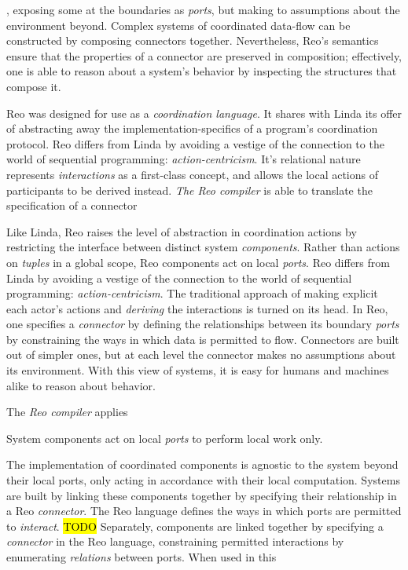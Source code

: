 , exposing some at the boundaries as \textit{ports}, but making to assumptions about the environment beyond. Complex systems of coordinated data-flow can be constructed by composing connectors together. Nevertheless, Reo's semantics ensure that the properties of a connector are preserved in composition; effectively, one is able to reason about a system's behavior by inspecting the structures that compose it.

Reo was designed for use as a \textit{coordination language}. It shares with Linda its offer of abstracting away the implementation-specifics of a program's coordination protocol. Reo differs from Linda by avoiding a vestige of the connection to the world of sequential programming: \textit{action-centricism}. It's relational nature represents \textit{interactions} as a first-class concept, and allows the local actions of participants to be derived instead. \textit{The Reo compiler} is able to translate the specification of a connector


Like Linda, Reo raises the level of abstraction in coordination actions by restricting the interface between distinct system \textit{components}. Rather than actions on \textit{tuples} in a global scope, Reo components act on local \textit{ports}. Reo differs from Linda by avoiding a vestige of the connection to the world of sequential programming: \textit{action-centricism}. The traditional approach of making explicit each actor's actions and \textit{deriving} the interactions is turned on its head. In Reo, one specifies a \textit{connector} by defining the relationships between its boundary \textit{ports} by constraining the ways in which data is permitted to flow. Connectors are built out of simpler ones, but at each level the connector makes no assumptions about its environment. With this view of systems, it is easy for humans and machines alike to reason about behavior.


The \textit{Reo compiler} applies   


System components act on local \textit{ports} to perform local work only. 


The implementation of coordinated components is agnostic to the system beyond their local ports, only acting in accordance with their local computation. Systems are built by linking these components together by specifying their relationship in a Reo \textit{connector}. The Reo language defines the ways in which ports are permitted to \textit{interact}. 
\hl{TODO}
Separately, components are linked together by specifying a \textit{connector} in the Reo language, constraining permitted interactions by enumerating \textit{relations} between ports. When used in this

